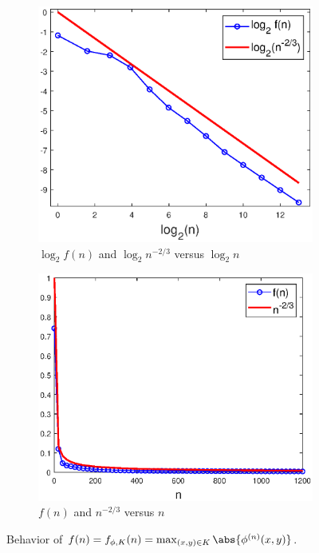 \documentclass[11pt, letter]{book}
\newenvironment{example}
  {\pushQED{\qed}\renewcommand{\qedsymbol}{$\triangle$}\examplex}
  {\popQED\endexamplex}
\begin{document}
\begin{example}
\begin{figure}[!htb]
    \begin{subfigure}{0.49\textwidth}
    \centering
    \includegraphics[scale=0.58]{Fig9a.eps}
    \caption{$\log_2 f(n)$ and $\log_2 n^{-2/3}$ versus $\log_2 n$}
    \end{subfigure}
    \begin{subfigure}{0.49\textwidth}
    \centering
    \includegraphics[scale=0.58]{Fig9b.eps}
    \caption{$f(n)$ and $n^{-2/3}$ versus $n$}
    \end{subfigure}
    \caption{Behavior of $f(n)=f_{\phi,K}(n)=\max_{(x,y)\in K}\abs{\phi^{(n)}(x,y)}$.}
    \label{fig:Conv_Pwr_5}
\end{figure}



\end{example}
\end{document}
